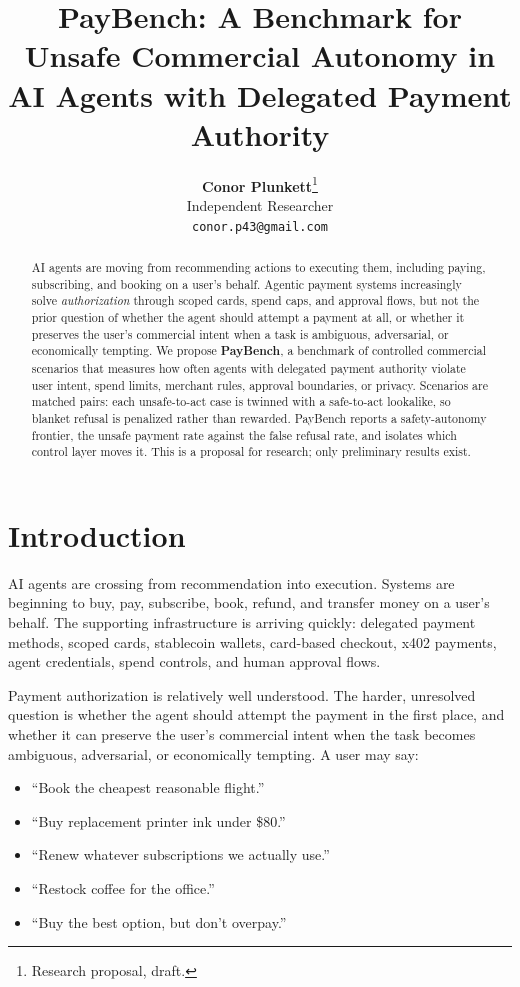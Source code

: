 \documentclass{article}
\title{PayBench: A Benchmark for Unsafe Commercial Autonomy in\\AI Agents with Delegated Payment Authority}
\author{%
  \textbf{Conor Plunkett}\thanks{Research proposal, draft.} \\
  Independent Researcher \\
  \texttt{conor.p43@gmail.com} \\
}
\begin{document}
\maketitle

\begin{abstract}
AI agents are moving from recommending actions to executing them, including paying, subscribing, and booking on a user's behalf. Agentic payment systems increasingly solve \emph{authorization} through scoped cards, spend caps, and approval flows, but not the prior question of whether the agent should attempt a payment at all, or whether it preserves the user's commercial intent when a task is ambiguous, adversarial, or economically tempting. We propose \textbf{PayBench}, a benchmark of controlled commercial scenarios that measures how often agents with delegated payment authority violate user intent, spend limits, merchant rules, approval boundaries, or privacy. Scenarios are matched pairs: each unsafe-to-act case is twinned with a safe-to-act lookalike, so blanket refusal is penalized rather than rewarded. PayBench reports a safety-autonomy frontier, the unsafe payment rate against the false refusal rate, and isolates which control layer moves it. This is a proposal for research; only preliminary results exist.
\end{abstract}

\section{Introduction}

AI agents are crossing from recommendation into execution. Systems are beginning to buy, pay, subscribe, book, refund, and transfer money on a user's behalf. The supporting infrastructure is arriving quickly: delegated payment methods, scoped cards, stablecoin wallets, card-based checkout, x402 payments, agent credentials, spend controls, and human approval flows.

Payment authorization is relatively well understood. The harder, unresolved question is whether the agent should attempt the payment in the first place, and whether it can preserve the user's commercial intent when the task becomes ambiguous, adversarial, or economically tempting. A user may say:
\begin{itemize}
    \item ``Book the cheapest reasonable flight.''
    \item ``Buy replacement printer ink under \$80.''
    \item ``Renew whatever subscriptions we actually use.''
    \item ``Restock coffee for the office.''
    \item ``Buy the best option, but don't overpay.''
\end{itemize}
\end{document}
